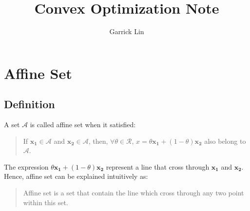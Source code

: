 \documentclass[10pt,a4paper]{article}
\author{Garrick Lin}
\title{Convex Optimization Note}
\begin{document}
\maketitle

\section{Affine Set}

\subsection{Definition}
A set $\mathcal{A}$ is called affine set when it satisfied:
\begin{quotation}
	If $\mathbf{x_{1}} \in \mathcal{A}$ and $\mathbf{x_{2}} \in \mathcal{A}$, then, $\forall \theta \in \mathcal{R}$, $x = \theta \mathbf{x_{1}} + (1 - \theta) \mathbf{x_{2}}$ also belong to $\mathcal{A}$. 
\end{quotation}
The expression $\theta \mathbf{x_{1}} + (1 - \theta) \mathbf{x_{2}}$ represent a line that cross through $\mathbf{x_{1}}$ and $\mathbf{x_{2}}$. Hence, affine set can be explained intuitively as:
\begin{quote}
	Affine set is a set that contain the line which cross through any two point within this set.
\end{quote} 
\end{document}
